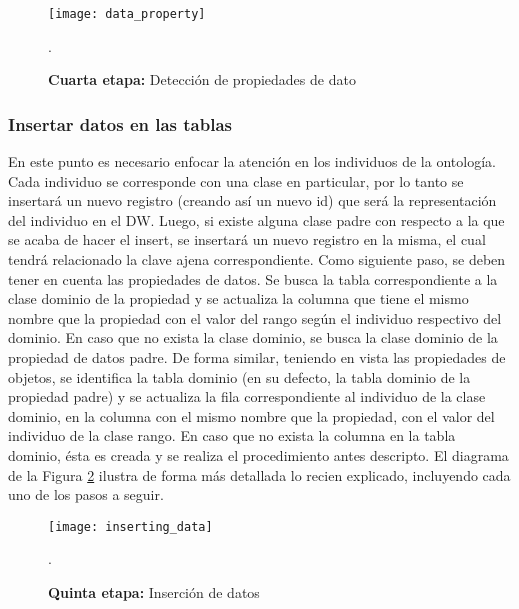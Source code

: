 \documentclass[a4paper,11pt]{article}
\begin{document}
    \begin{figure}[!htb]
      \begin{center}
        \texttt{[image: data\_property]}
        \caption{\textbf{Cuarta etapa:} Detección de propiedades de dato} \cite[p.~21]{ontologias}.
        \label{dataProperty}
      \end{center}
    \end{figure}
    
    
    \subsubsection{Insertar datos en las tablas}
    
    En este punto es necesario enfocar la atención en los individuos de la ontología. Cada individuo se corresponde con una clase en particular, por lo tanto se
    insertará un nuevo registro (creando así un nuevo id) que será la representación del individuo en el DW. Luego, si existe alguna clase padre con respecto a la
    que se acaba de hacer el insert, se insertará un nuevo registro en la misma, el cual tendrá relacionado la clave ajena correspondiente. Como siguiente paso,
    se deben tener en cuenta las propiedades de datos. Se busca la tabla correspondiente a la clase dominio de la propiedad y se actualiza la columna que tiene el
    mismo nombre que la propiedad con el valor del rango según el individuo respectivo del dominio. En caso que no exista la clase dominio, se busca la clase
    dominio de la propiedad de datos padre. De forma similar, teniendo en vista las propiedades de objetos,  se identifica la tabla dominio (en su defecto, la 
    tabla dominio de la propiedad padre) y se actualiza la fila correspondiente al individuo de la clase dominio, en la columna con el mismo nombre que la
    propiedad, con el valor del individuo de la clase rango. En caso que no exista la columna en la tabla dominio, ésta es creada y se realiza el procedimiento
    antes descripto. El diagrama de la Figura \ref{insertingData} ilustra de forma más detallada lo recien explicado, incluyendo cada uno de los pasos a seguir.
    
    \begin{figure}[!htb]
      \begin{center}
        \texttt{[image: inserting\_data]}
        \caption{\textbf{Quinta etapa:} Inserción de datos} \cite[p.~22]{ontologias}.
        \label{insertingData}
      \end{center}
    \end{figure}
    
\end{document}
